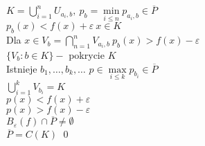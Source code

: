 \documentclass[twoside,10pt]{article}
\theoremstyle{definition}
\theoremstyle{definition}
\theoremstyle{definition}
\theoremstyle{definition}
\theoremstyle{remark}
\theoremstyle{definition}
\theoremstyle{definition}
\theoremstyle{definition}
\theoremstyle{definition}
\theoremstyle{definition}
\theoremstyle{definition}
\begin{document}
$K = \bigcup\limits_{i=1}^n U_{a_i,b},\ p_b = \min\limits_{i \le n} p_{a_i,b} \in 
\overline P$ \\ 
$p_b (x) < f(x) + \varepsilon \ x \in K$ \\
Dla $x \in V_b = \bigcap\limits_{n=1}^n V_{a_i,b} \ p_b (x) > f(x) - \varepsilon$ \\ 
$\{V_b: b \in K\} - $ pokrycie $K$ \\ 
Istnieje $b_1,\ldots,b_k,\ldots$ $p \in \max\limits_{i \le k} p_{b_i} \in \overline P$ \\ 
$\bigcup\limits_{i = 1}^k V_{b_i} = K$ \\ 
$p(x) < f(x) + \varepsilon$ \\ 
$p(x) > f(x) - \varepsilon$ \\ 
$B_\varepsilon (f) \cap \overline P \neq \emptyset$ \\ 
$\overline P = C(K)$ \hfill \qed
\end{document}
